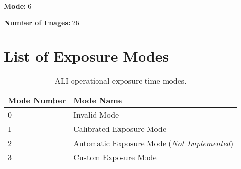 \textbf{Mode:} 6

\textbf{Number of Images:} 26

\section{List of Exposure Modes}
\label{sec:B.3:ExposureModes} 

\begin{table}
    \begin{center}
    \begin{tabular}{|l|l|}
    \hline
    Mode Number & Mode Name \\
    \hline
    0 & Invalid Mode \\
    \hline
    1 & Calibrated Exposure Mode \\
    \hline
    2 & Automatic Exposure Mode (\textit{Not Implemented}) \\
    \hline
    3 & Custom Exposure Mode \\
    \hline
    \end{tabular}
    \end{center}
    \caption[ALI Operational Exposure Time Modes]{ALI operational exposure time modes.}
    \label{tab:B.3:ExposureModes}
\end{table}